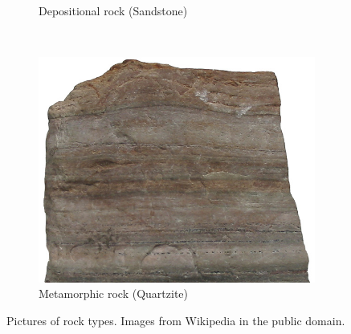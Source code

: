 \documentclass[a4paper,12pt]{report}
\begin{document}
\begin{figure}[]
\begin{subfigure}[b]{0.3\textwidth}
                \caption{Depositional rock (Sandstone)}
                \label{fig:tiger}
        \end{subfigure}
        ~ %
        \begin{subfigure}[b]{0.3\textwidth}
                \centering
                \includegraphics[width=\textwidth]{thesis/geo/quartzite.jpg}
                \caption{Metamorphic rock (Quartzite)}
                \label{fig:mouse}
        \end{subfigure}
        \caption{Pictures of rock types. Images from Wikipedia in the public domain.}\label{fig:rocks}
\end{figure}
\end{document}
